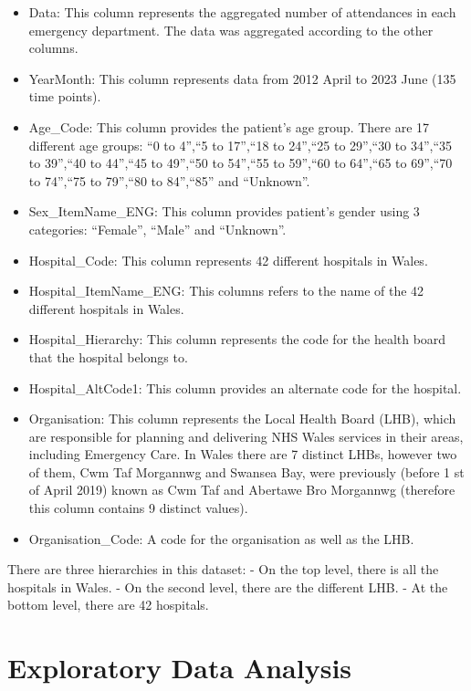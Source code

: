 \documentclass[
]{article}
\begin{document}
\begin{itemize}
\item
  Data: This column represents the aggregated number of attendances in each emergency department. The data was aggregated according to the other columns.
\item
  YearMonth: This column represents data from 2012 April to 2023 June (135 time points).
\item
  Age\_Code: This column provides the patient's age group. There are 17 different age groups: ``0 to 4'',``5 to 17'',``18 to 24'',``25 to 29'',``30 to 34'',``35 to 39'',``40 to 44'',``45 to 49'',``50 to 54'',``55 to 59'',``60 to 64'',``65 to 69'',``70 to 74'',``75 to 79'',``80 to 84'',``85'' and ``Unknown''.
\item
  Sex\_ItemName\_ENG: This column provides patient's gender using 3 categories: ``Female'', ``Male'' and ``Unknown''.
\item
  Hospital\_Code: This column represents 42 different hospitals in Wales.
\item
  Hospital\_ItemName\_ENG: This columns refers to the name of the 42 different hospitals in Wales.
\item
  Hospital\_Hierarchy: This column represents the code for the health board that the hospital belongs to.
\item
  Hospital\_AltCode1: This column provides an alternate code for the hospital.
\item
  Organisation: This column represents the Local Health Board (LHB), which are responsible for planning and delivering NHS Wales services in their areas, including Emergency Care. In Wales there are 7 distinct LHBs, however two of them, Cwm Taf Morgannwg and Swansea Bay, were previously (before 1 st of April 2019) known as Cwm Taf and Abertawe Bro Morgannwg (therefore this column contains 9 distinct values).
\item
  Organisation\_Code: A code for the organisation as well as the LHB.
\end{itemize}

There are three hierarchies in this dataset:
- On the top level, there is all the hospitals in Wales.
- On the second level, there are the different LHB.
- At the bottom level, there are 42 hospitals.

\newpage

\hypertarget{exploratory-data-analysis}{%
\section{Exploratory Data Analysis}\label{exploratory-data-analysis}}
\end{document}
